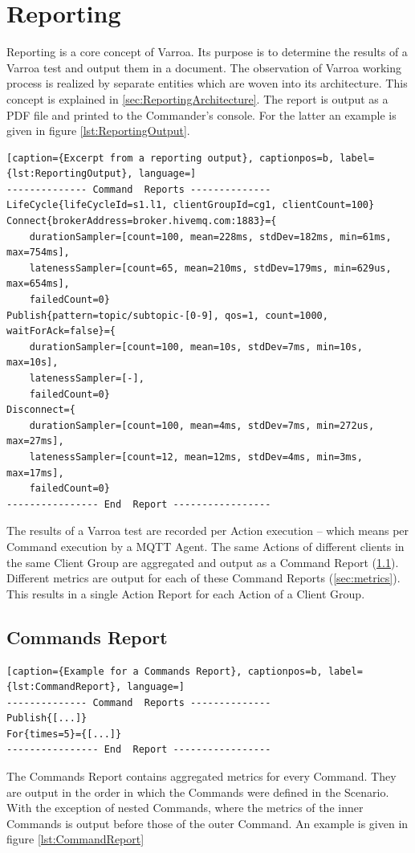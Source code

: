 \chapter{Reporting}\label{sec:Reporting}
Reporting is a core concept of Varroa.
Its purpose is to determine the results of a Varroa test and output them in a document.
The observation of Varroa working process is realized by separate entities which are woven into its architecture.
This concept is explained in \ref{sec:ReportingArchitecture}.
The report is output as a PDF file and printed to the Commander's console.
For the latter an example is given in figure \ref{lst:ReportingOutput}.
\\
\begin{lstlisting}[caption={Excerpt from a reporting output}, captionpos=b, label={lst:ReportingOutput}, language=]
-------------- Command  Reports --------------
LifeCycle{lifeCycleId=s1.l1, clientGroupId=cg1, clientCount=100}
Connect{brokerAddress=broker.hivemq.com:1883}={
	durationSampler=[count=100, mean=228ms, stdDev=182ms, min=61ms, max=754ms],
	latenessSampler=[count=65, mean=210ms, stdDev=179ms, min=629us, max=654ms],
	failedCount=0}
Publish{pattern=topic/subtopic-[0-9], qos=1, count=1000, waitForAck=false}={
	durationSampler=[count=100, mean=10s, stdDev=7ms, min=10s, max=10s],
	latenessSampler=[-],
	failedCount=0}
Disconnect={
	durationSampler=[count=100, mean=4ms, stdDev=7ms, min=272us, max=27ms],
	latenessSampler=[count=12, mean=12ms, stdDev=4ms, min=3ms, max=17ms],
	failedCount=0}
---------------- End  Report -----------------
\end{lstlisting}
The results of a Varroa test are recorded per Action execution -- which means per Command execution by a MQTT Agent.
The same Actions of different clients in the same Client Group are aggregated and output as a Command Report (\ref{sec:commandsReport}).
Different metrics are output for each of these Command Reports (\ref{sec:metrics}).
This results in a single Action Report for each Action of a Client Group.

\newpage
\section{Commands Report}
\label{sec:commandsReport}
\begin{lstlisting}[caption={Example for a Commands Report}, captionpos=b, label={lst:CommandReport}, language=]
-------------- Command  Reports --------------
Publish{[...]}
For{times=5}={[...]}
---------------- End  Report -----------------
\end{lstlisting}
The Commands Report contains aggregated metrics for every Command.
They are output in the order in which the Commands were defined in the Scenario.
With the exception of nested Commands, where the metrics of the inner Commands is output before those of the outer Command.
An example is given in figure \ref{lst:CommandReport}

